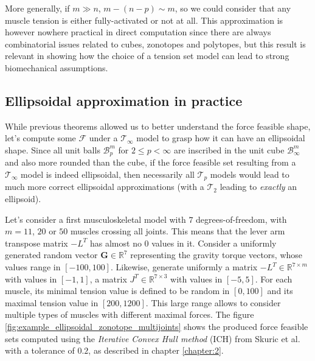 More generally, if $m \gg n$, $m-(n-p) \sim m$, so we could consider that any muscle tension is either fully-activated or not at all. This approximation is however nowhere practical in direct computation since there are always combinatorial issues related to cubes, zonotopes and polytopes, but this result is relevant in showing how the choice of a tension set model can lead to strong biomechanical assumptions. 

\subsection{Ellipsoidal approximation in practice}
\label{subsec:ellipsoidal_approx_in_practice}
While previous theorems allowed us to better understand the force feasible shape, let's compute some $\mathcal{F}$ under a $\mathcal{T}_{\infty}$ model to grasp how it can have an ellipsoidal shape. Since all unit balls $\mathcal{B}_p^m$ for $2 \leq p < \infty$ are inscribed in the unit cube $\mathcal{B}_{\infty}^m$ and also more rounded than the cube, if the force feasible set resulting from a $\mathcal{T}_{\infty}$ model is indeed ellipsoidal, then necessarily all $\mathcal{T}_p$ models would lead to much more correct ellipsoidal approximations (with a $\mathcal{T}_2$ leading to \emph{exactly} an ellipsoid).

Let's consider a first musculoskeletal model with $7$ degrees-of-freedom, with $m = 11$, $20$ or $50$ muscles crossing all joints. This means that the lever arm transpose matrix $-L^T$ has almost no $0$ values in it. Consider a uniformly generated random vector $\mathbf{G}\in \mathbb{R}^7$ representing the gravity torque vectors, whose values range in $[-100,100]$. Likewise, generate uniformly a matrix $-L^T \in \mathbb{R}^{7 \times m}$ with values in $[-1,1]$, a matrix $J^T \in \mathbb{R}^{7\times 3}$ with values in $[-5,5]$. For each muscle, its minimal tension value is defined to be random in $[0,100]$ and its maximal tension value in $[200, 1200]$. This large range allows to consider multiple types of muscles with different maximal forces. The figure \ref{fig:example_ellipsoidal_zonotope_multijoints} shows the produced force feasible sets computed using the \emph{Iterative Convex Hull method} (ICH) from Skuric et al. \cite{skuricOnLineFeasibleWrench2022} with a tolerance of $0.2$, as described in chapter \ref{chapter:2}.

